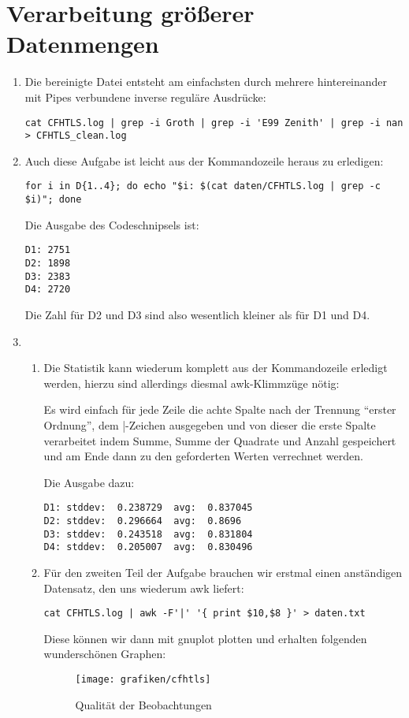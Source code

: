 \section{Verarbeitung größerer Datenmengen}

\begin{enumerate}
  \item Die bereinigte Datei entsteht am einfachsten durch mehrere
    hintereinander mit Pipes verbundene inverse reguläre Ausdrücke:
    \begin{lstlisting}[style=Bash]
cat CFHTLS.log | grep -i Groth | grep -i 'E99 Zenith' | grep -i nan > CFHTLS_clean.log
    \end{lstlisting}
  \item Auch diese Aufgabe ist leicht aus der Kommandozeile heraus zu erledigen:
    \begin{lstlisting}
for i in D{1..4}; do echo "$i: $(cat daten/CFHTLS.log | grep -c $i)"; done
    \end{lstlisting}
    Die Ausgabe des Codeschnipsels ist:
    \begin{verbatim}
D1: 2751
D2: 1898
D3: 2383
D4: 2720
    \end{verbatim}
    Die Zahl für D2 und D3 sind also wesentlich kleiner als für D1 und D4.

  \item
    \begin{enumerate}
      \item Die Statistik kann wiederum komplett aus der Kommandozeile erledigt
        werden, hierzu sind allerdings diesmal awk-Klimmzüge nötig:
        
        Es wird einfach für jede Zeile die achte Spalte nach der Trennung
        "`erster Ordnung"', dem |-Zeichen ausgegeben und von dieser die erste
        Spalte verarbeitet indem Summe, Summe der Quadrate und Anzahl gespeichert
        und am Ende dann zu den geforderten Werten verrechnet werden.

        Die Ausgabe dazu:
        \begin{verbatim}
D1: stddev:  0.238729  avg:  0.837045
D2: stddev:  0.296664  avg:  0.8696
D3: stddev:  0.243518  avg:  0.831804
D4: stddev:  0.205007  avg:  0.830496        
        \end{verbatim}
      \item Für den zweiten Teil der Aufgabe brauchen wir erstmal einen
        anständigen Datensatz, den uns wiederum awk liefert:
        \begin{lstlisting}
cat CFHTLS.log | awk -F'|' '{ print $10,$8 }' > daten.txt
        \end{lstlisting}
        Diese können wir dann mit gnuplot plotten und erhalten folgenden
        wunderschönen Graphen:
        \begin{figure}[h!]
          \begin{center}
            \texttt{[image: grafiken/cfhtls]}
          \end{center}
          \caption{Qualität der Beobachtungen}
          \label{fig:cfhtls}
        \end{figure}
    \end{enumerate}
\end{enumerate}
